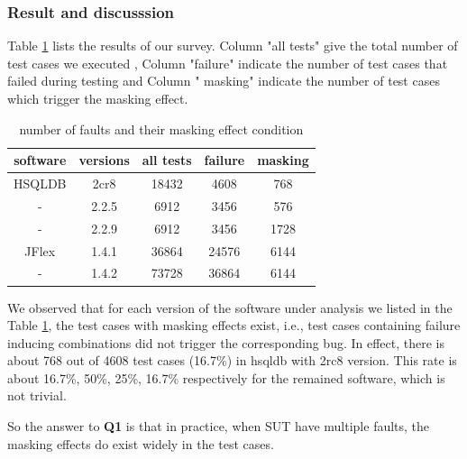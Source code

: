 \documentclass{sig-alternate}
\begin{document}
\subsubsection{Result and discusssion}

Table \ref{masking effect condition} lists the results of our survey. Column "all tests" give the total number of test cases we executed , Column "failure" indicate the number of test cases that failed during testing and Column " masking" indicate the number of test cases which trigger the masking effect.


\begin{table}\renewcommand{\arraystretch}{1.3}
\caption{number of faults and their masking effect condition}
\label{masking effect condition}
\begin{tabular}{c|c|c|c|c} \hline
software & versions & all tests & failure & masking\\ \hline
HSQLDB & 2cr8 & 18432 & 4608 & 768\\ \hline
     - & 2.2.5 & 6912 & 3456 & 576\\ \hline
     - & 2.2.9 & 6912 & 3456 &1728\\ \hline
JFlex & 1.4.1 & 36864 & 24576 &6144\\ \hline
     -& 1.4.2 & 73728 & 36864 &6144\\ \hline
\hline\end{tabular}
\end{table}

We observed that for each version of the software under analysis we listed in the Table \ref{masking effect condition}, the test cases with masking effects exist, i.e., test cases containing failure inducing combinations did not trigger the corresponding bug. In effect, there is about 768 out of 4608 test cases (16.7\%) in hsqldb with 2rc8 version. This rate is about 16.7\%, 50\%, 25\%, 16.7\% respectively for the remained software, which is not trivial.

So the answer to \textbf{Q1} is that in practice, when SUT have multiple faults, the masking effects do exist widely in the test cases.

%
%
\end{document}
